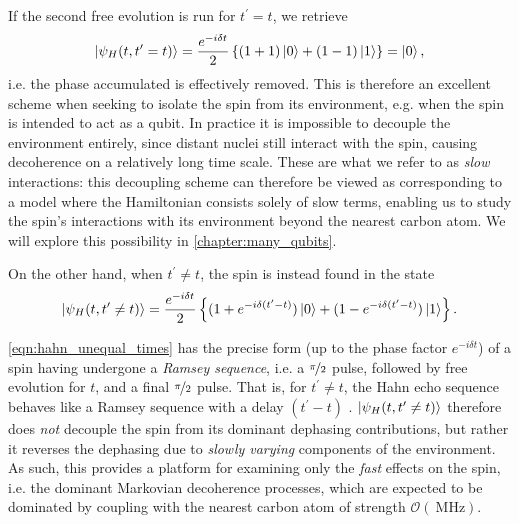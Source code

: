 If the second free evolution is run for $t^{\prime} = t$, we retrieve
\begin{equation}
    \ket{\psi_H(t, t^{\prime}=t)} = \frac{e^{-i \delta t}}{2} \left\{ (1 +1)\ket{0} + (1 - 1)\ket{1}  \right\} = \ket{0},    
\end{equation}
    i.e. the phase accumulated is effectively removed. 
This is therefore an excellent scheme when seeking to isolate the spin from its environment, 
    e.g. when the spin is intended to act as a qubit. 
In practice it is impossible to decouple the environment entirely, 
    since distant nuclei still interact with the spin, %
    causing decoherence on a relatively long time scale\footnotemark.
These are what we refer to as \emph{slow} interactions: 
    this decoupling scheme can therefore be viewed as corresponding to a model 
    where the Hamiltonian consists solely of slow terms, 
    enabling us to study the spin's interactions with its environment beyond 
    the nearest \gls{carbon} atom.
We will explore this possibility in \cref{chapter:many_qubits}.
\par 

On the other hand, when $t^{\prime} \neq t$, the spin is instead found in the state
\begin{equation}
    \label{eqn:hahn_unequal_times}
    \ket{\psi_H(t, t^{\prime}\neq t)} = \frac{e^{-i \delta t}}{2} \left\{ (1 + e^{-i \delta(t^{\prime} - t)})\ket{0} + (1 - e^{-i \delta(t^{\prime} - t)})\ket{1}  \right\}.
\end{equation}

\cref{eqn:hahn_unequal_times} has the precise form (up to the phase factor $e^{-i \delta t}$)
    of a spin having undergone a \emph{Ramsey sequence}, 
    i.e. a $\nicefrac{\pi}{2}$ pulse, followed by free evolution for $t$, and a final $\nicefrac{\pi}{2}$ pulse.
That is, for $t^{\prime}\neq t$, the Hahn echo sequence behaves like 
    a Ramsey sequence with a delay $(t^{\prime} - t)$ \cite{childress2007coherent}. 
$\ket{\psi_H(t, t^{\prime}\neq t)}$ therefore does \emph{not} decouple the spin from its dominant dephasing contributions, 
    but rather it reverses the dephasing due to \emph{slowly varying} components of the environment. 
As such, this provides a platform for examining only the \emph{fast} effects on the spin, 
    i.e. the dominant Markovian decoherence processes, which are expected to be dominated by 
    coupling with the nearest \gls{carbon} atom of strength $\mathcal{O}(\SI{}{\mega\hertz})$. 
\par 

